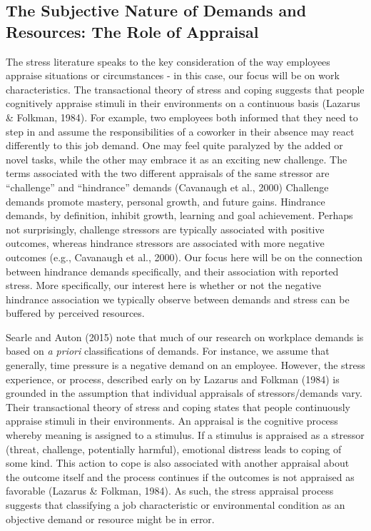 \documentclass[
  man]{apa6}
\begin{document}
\hypertarget{the-subjective-nature-of-demands-and-resources-the-role-of-appraisal}{%
\subsection{The Subjective Nature of Demands and Resources: The Role of Appraisal}\label{the-subjective-nature-of-demands-and-resources-the-role-of-appraisal}}

The stress literature speaks to the key consideration of the way employees appraise situations or circumstances - in this case, our focus will be on work characteristics. The transactional theory of stress and coping suggests that people cognitively appraise stimuli in their environments on a continuous basis (Lazarus \& Folkman, 1984). For example, two employees both informed that they need to step in and assume the responsibilities of a coworker in their absence may react differently to this job demand. One may feel quite paralyzed by the added or novel tasks, while the other may embrace it as an exciting new challenge. The terms associated with the two different appraisals of the same stressor are ``challenge'' and ``hindrance'' demands (Cavanaugh et al., 2000) Challenge demands promote mastery, personal growth, and future gains. Hindrance demands, by definition, inhibit growth, learning and goal achievement. Perhaps not surprisingly, challenge stressors are typically associated with positive outcomes, whereas hindrance stressors are associated with more negative outcomes (e.g., Cavanaugh et al., 2000). Our focus here will be on the connection between hindrance demands specifically, and their association with reported stress. More specifically, our interest here is whether or not the negative hindrance association we typically observe between demands and stress can be buffered by perceived resources.

Searle and Auton (2015) note that much of our research on workplace demands is based on \emph{a priori} classifications of demands. For instance, we assume that generally, time pressure is a negative demand on an employee. However, the stress experience, or process, described early on by Lazarus and Folkman (1984) is grounded in the assumption that individual appraisals of stressors/demands vary. Their transactional theory of stress and coping states that people continuously appraise stimuli in their environments. An appraisal is the cognitive process whereby meaning is assigned to a stimulus. If a stimulus is appraised as a stressor (threat, challenge, potentially harmful), emotional distress leads to coping of some kind. This action to cope is also associated with another appraisal about the outcome itself and the process continues if the outcomes is not appraised as favorable (Lazarus \& Folkman, 1984). As such, the stress appraisal process suggests that classifying a job characteristic or environmental condition as an objective demand or resource might be in error.
\end{document}
